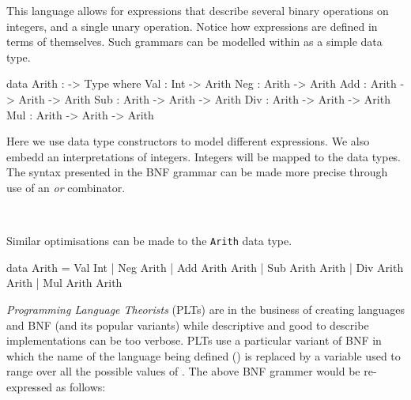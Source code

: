 \noindent
This language allows for expressions that describe several binary operations on integers, and a single unary operation.
Notice how expressions are defined in terms of themselves.
Such grammars can be modelled within \idris{} as a simple data type.

\begin{code}
data Arith : -> Type where
  Val : Int            -> Arith
  Neg : Arith          -> Arith
  Add : Arith -> Arith -> Arith
  Sub : Arith -> Arith -> Arith
  Div : Arith -> Arith -> Arith
  Mul : Arith -> Arith -> Arith
\end{code}

\noindent
Here we use data type constructors to model different expressions.
We also embedd an interpretations of integers.
Integers will be mapped to the \idris{} data types.
The syntax presented in the BNF grammar can be made more precise through use of an \emph{or} combinator.

\begin{bnf}
\\
\end{bnf}

\noindent
Similar optimisations can be made to the \texttt{Arith} data type.

\begin{code}
data Arith = Val Int
           | Neg Arith
           | Add Arith Arith
           | Sub Arith Arith
           | Div Arith Arith
           | Mul Arith Arith
\end{code}

\noindent
\emph{Programming Language Theorists} (PLTs) are in the business of creating languages and BNF (and its popular variants) while descriptive and good to describe implementations can be too verbose.
PLTs use a particular variant of BNF in which the name of the language being defined (\allang{}) is replaced by a variable used to range over all the possible values of \allang{}.
The above BNF grammer would be re-expressed as follows:

\begin{bnf}
\end{bnf}

